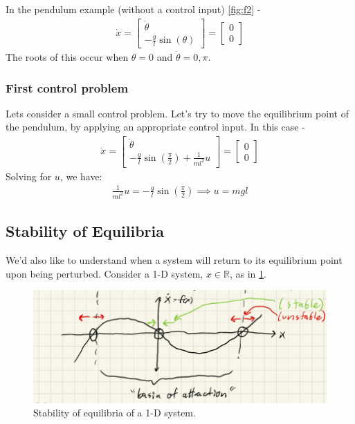 \noindent
In the pendulum example (without a control input) \cref{fig:f2} - 
\begin{align}
    \dot{x} = \begin{bmatrix}
        \dot{\theta} \\
        -\frac{g}{l} \sin(\theta) 
    \end{bmatrix}
    = 
    \begin{bmatrix}
        0 \\
        0
    \end{bmatrix}
\end{align}
The roots of this occur when $\theta=0$ and $\dot{\theta}=0, \pi$.

\subsubsection{First control problem}
Lets consider a small control problem. Let's try to move the equilibrium point of the pendulum, by applying an appropriate control input. In this case - 
\begin{align}
    \dot{x} = \begin{bmatrix}
        \dot{\theta} \\
        - \frac{g}{l} \sin(\frac{\pi}{2}) + \frac{1}{ml^2} u 
    \end{bmatrix}
    =
    \begin{bmatrix}
        0 \\
        0
    \end{bmatrix}
\end{align}
Solving for $u$, we have:
\begin{align}
    \frac{1}{ml^2} u = - \frac{g}{l} \sin (\frac{\pi}{2}) 
    \implies u = mgl
\end{align}

\subsection{Stability of Equilibria}
We'd also like to understand when a system will return to its equilibrium point upon being perturbed.
Consider a 1-D system, $x \in \mathbb{R}$, as in \cref{fig:f3}.\\

\begin{figure}
    \centering
    \includegraphics[width=\linewidth]{L1_Images/F3.PNG}
    \caption{Stability of equilibria of a 1-D system.}
    \label{fig:f3}
\end{figure}


